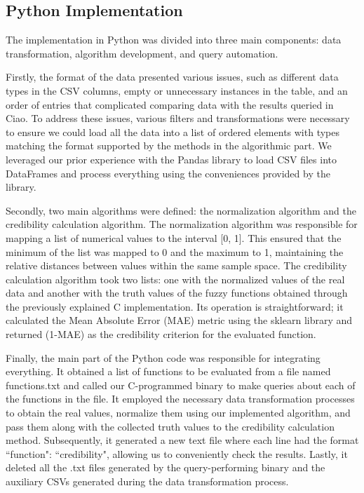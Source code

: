 \documentclass[fleqn,11pt]{article}
\begin{document}
\newpage
\subsection{Python Implementation}

The implementation in Python was divided into three main components: data transformation, algorithm development, and query automation.

Firstly, the format of the data presented various issues, such as different data types in the CSV columns, empty or unnecessary instances in the table, and an order of entries that complicated comparing data with the results queried in Ciao. To address these issues, various filters and transformations were necessary to ensure we could load all the data into a list of ordered elements with types matching the format supported by the methods in the algorithmic part. We leveraged our prior experience with the Pandas library to load CSV files into DataFrames and process everything using the conveniences provided by the library.

Secondly, two main algorithms were defined: the normalization algorithm and the credibility calculation algorithm. The normalization algorithm was responsible for mapping a list of numerical values to the interval [0, 1]. This ensured that the minimum of the list was mapped to 0 and the maximum to 1, maintaining the relative distances between values within the same sample space. The credibility calculation algorithm took two lists: one with the normalized values of the real data and another with the truth values of the fuzzy functions obtained through the previously explained C implementation. Its operation is straightforward; it calculated the Mean Absolute Error (MAE) metric using the sklearn library and returned (1-MAE) as the credibility criterion for the evaluated function.

Finally, the main part of the Python code was responsible for integrating everything. It obtained a list of functions to be evaluated from a file named functions.txt and called our C-programmed binary to make queries about each of the functions in the file. It employed the necessary data transformation processes to obtain the real values, normalize them using our implemented algorithm, and pass them along with the collected truth values to the credibility calculation method. Subsequently, it generated a new text file where each line had the format ``function": ``credibility", allowing us to conveniently check the results. Lastly, it deleted all the .txt files generated by the query-performing binary and the auxiliary CSVs generated during the data transformation process.
\end{document}
